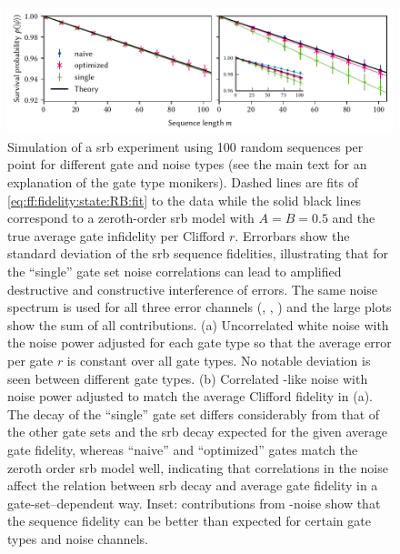 \begin{figure}
    \centering
    \includegraphics{img/pdf/filter_functions/randomized_benchmarking}
    \caption[]{
        Simulation of a \gls{srb} experiment using \num{100} random sequences per point for different gate and noise types (see the main text for an explanation of the gate type monikers).
        Dashed lines are fits of \cref{eq:ff:fidelity:state:RB:fit} to the data while the solid black lines correspond to a zeroth-order \gls{srb} model with $A=B=\num{0.5}$ and the true average gate infidelity per Clifford $r$.
        Errorbars show the standard deviation of the \gls{srb} sequence fidelities, illustrating that for the \enquote{single} gate set noise correlations can lead to amplified destructive and constructive interference of errors.
        The same noise spectrum is used for all three error channels (\sx, \sy, \sz) and the large plots show the sum of all contributions.
        (a) Uncorrelated white noise with the noise power adjusted for each gate type so that the average error per gate $r$ is constant over all gate types.
        No notable deviation is seen between different gate types.
        (b) Correlated \oneoverf-like noise with noise power adjusted to match the average Clifford fidelity in (a).
        The decay of the \enquote{single} gate set differs considerably from that of the other gate sets and the \gls{srb} decay expected for the given average gate fidelity, whereas \enquote{naive} and \enquote{optimized} gates match the zeroth order \gls{srb} model well, indicating that correlations in the noise affect the relation between \gls{srb} decay and average gate fidelity in a gate-set--dependent way.
        Inset: contributions from \sz-noise show that the sequence fidelity can be better than expected for certain gate types and noise channels.
    }
    \label{fig:ff:randomized_benchmarking:noise_comparison}
\end{figure}

